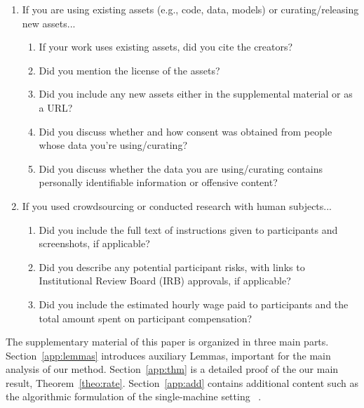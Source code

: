 \documentclass[11pt]{article}
\begin{document}
\begin{enumerate}
\item If you are using existing assets (e.g., code, data, models) or curating/releasing new assets...
\begin{enumerate}
  \item If your work uses existing assets, did you cite the creators?
    \answerYes{}
  \item Did you mention the license of the assets?
    \answerNA{}
  \item Did you include any new assets either in the supplemental material or as a URL?
    \answerNA{}
  \item Did you discuss whether and how consent was obtained from people whose data you're using/curating?
    \answerNA{}
  \item Did you discuss whether the data you are using/curating contains personally identifiable information or offensive content?
    \answerNA{}
\end{enumerate}

\item If you used crowdsourcing or conducted research with human subjects...
\begin{enumerate}
  \item Did you include the full text of instructions given to participants and screenshots, if applicable?
    \answerNA{}
  \item Did you describe any potential participant risks, with links to Institutional Review Board (IRB) approvals, if applicable?
    \answerNA{}
  \item Did you include the estimated hourly wage paid to participants and the total amount spent on participant compensation?
    \answerNA{}
\end{enumerate}

\end{enumerate}


\clearpage
\appendix 

  \hsize\textwidth
  \linewidth\hsize {}
 \bottomtitlebar 

The supplementary material of this paper is organized in three main parts.
Section~\ref{app:lemmas} introduces auxiliary Lemmas, important for the main analysis of our method.
Section~\ref{app:thm} is a detailed proof of the our main result, Theorem~\ref{theo:rate}.
Section~\ref{app:add} contains additional content such as the algorithmic formulation of the single-machine setting \algo\ .
\end{document}
